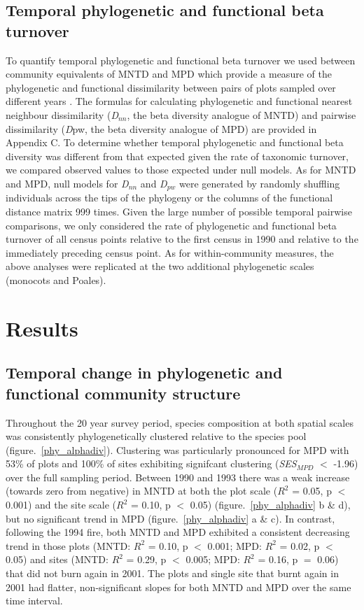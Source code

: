 \subsection{Temporal phylogenetic and functional beta turnover}

To quantify temporal phylogenetic and functional beta turnover we used between community equivalents of MNTD and MPD which provide a measure of the phylogenetic and functional dissimilarity between pairs of plots sampled over different years \citep{Ricotta2009, Swenson2012}. The formulas for calculating phylogenetic and functional nearest neighbour dissimilarity (\textit{D}$_{nn}$, the beta diversity analogue of MNTD) and pairwise dissimilarity (\textit{D}pw, the beta diversity analogue of MPD) are provided in Appendix C. To determine whether temporal phylogenetic and functional beta diversity was different from that expected given the rate of taxonomic turnover, we compared observed values to those expected under null models. As for MNTD and MPD, null models for \textit{D}$_{nn}$ and \textit{D}$_{pw}$ were generated by randomly shuffling individuals across the tips of the phylogeny or the columns of the functional distance matrix 999 times. Given the large number of possible temporal pairwise comparisons, we only considered the rate of phylogenetic and functional beta turnover of all census points relative to the first census in 1990 and relative to the immediately preceding census point. As for within-community measures, the above analyses were replicated at the two additional phylogenetic scales (monocots and Poales).  

\section{Results}

\subsection{Temporal change in phylogenetic and functional community structure}

Throughout the 20 year survey period, species composition at both spatial scales was consistently phylogenetically clustered relative to the species pool (figure.~\ref{phy_alphadiv}). Clustering was particularly pronounced for MPD with 53\% of plots and 100\% of sites exhibiting signifcant clustering (\textit{SES$_{MPD}$} $<$ -1.96) over the full sampling period. Between 1990 and 1993 there was a weak increase (towards zero from negative) in MNTD at both the plot scale ($R^{2}$ = 0.05, p $<$ 0.001) and the site scale ($R^{2}$ = 0.10, p $<$ 0.05) (figure.~\ref{phy_alphadiv} b \& d), but no significant trend in MPD (figure.~\ref{phy_alphadiv} a \& c). In contrast, following the 1994 fire, both MNTD and MPD exhibited a consistent decreasing trend in those plots (MNTD: $R^{2}$ = 0.10, p $<$ 0.001; MPD:  $R^{2}$ = 0.02, p $<$ 0.05) and sites (MNTD: $R^{2}$ = 0.29, p $<$ 0.005; MPD:  $R^{2}$ = 0.16, p $=$ 0.06) that did not burn again in 2001. The plots and single site that burnt again in 2001 had flatter, non-significant slopes for both MNTD and MPD over the same time interval. 


